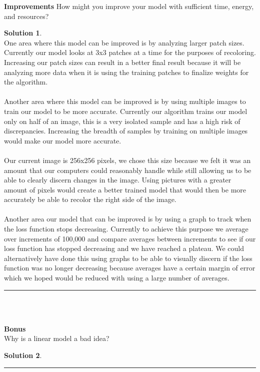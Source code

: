 \documentclass{article}
\theoremstyle{definition}
\def\fline{\rule{0.75\linewidth}{0.5pt}}
\newcommand{\finishline}{\vspace{-15pt}\begin{center}\fline\end{center}}
\newtheorem*{solution*}{Solution}
\newenvironment{solution}{\begin{solution*}}{{\finishline} \end{solution*}}
\begin{document}
    \textbf{Improvements}
        How might you improve your model with sufficient time, energy, and resources?
        \begin{solution} \hfill \\
        One area where this model can be improved is by analyzing larger patch sizes. Currently our model looks at 3x3 patches at a time for the purposes of recoloring. Increasing our patch sizes can result in a better final result because it will be analyzing more data when it is using the training patches to finalize weights for the algorithm.\\\\ Another area where this model can be improved is by using multiple images to train our model to be more accurate. Currently our algorithm trains our model only on half of an image, this is a very isolated sample and has a high risk of discrepancies. Increasing the breadth of samples by training on multiple images would make our model more accurate. \\\\
        Our current image is 256x256 pixels, we chose this size because we felt it was an amount that our computers could reasonably handle while still allowing us to be able to clearly discern changes in the image. Using pictures with a greater amount of pixels would create a better trained model that would then be more accurately be able to recolor the right side of the image. \\\\
        Another area our model that can be improved is by using a graph to track when the loss function stops decreasing. Currently to achieve this purpose we average over increments of 100,000 and compare averages between increments to see if our loss function has stopped decreasing and we have reached a plateau. We could alternatively have done this using graphs to be able to visually discern if the loss function was no longer decreasing because averages have a certain margin of error which we hoped would be reduced with using a large number of averages. 
        \end{solution}\\\\
\smallskip

\textbf{\Large Bonus} \\
    Why is a linear model a bad idea? 
    \begin{solution} \hfill \\
    
    \end{solution}\\
    
\end{document}

